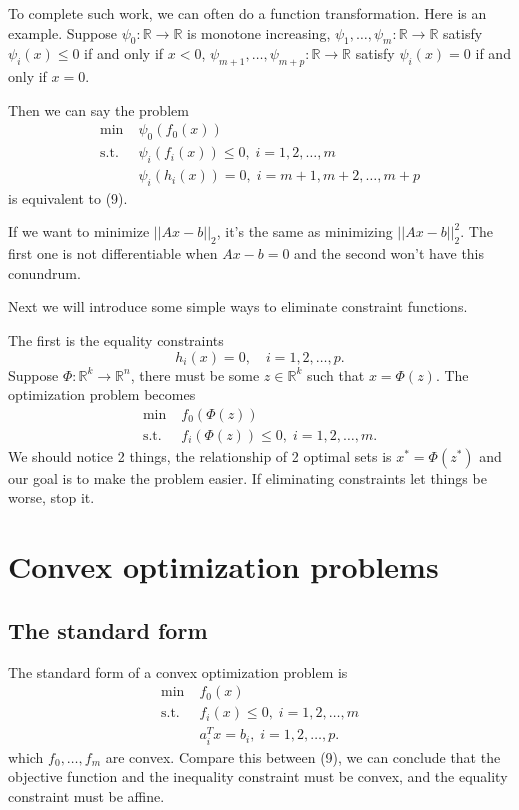 \documentclass[lang=en,color=blue,mode=fancy,titlestyle=hang]{elegantbook}
\begin{document}
To complete such work, we can often do a function transformation. Here is an example.
Suppose $\psi_0: \mathbb{R} \rightarrow \mathbb{R}$ is monotone increasing,
$\psi_1, \ldots, \psi_m: \mathbb{R} \rightarrow \mathbb{R}$ satisfy $\psi_i(x) \leq 0$
if and only if $x < 0$, $\psi_{m+1}, \ldots, \psi_{m+p}: \mathbb{R} \rightarrow \mathbb{R}$
satisfy $\psi_i(x) = 0$ if and only if $x = 0$.

Then we can say the problem
\begin{align*}
  \min \; &\psi_0(f_0(x)) \\
  \text{s.t.} \; &\psi_i(f_i(x)) \leq 0, \; i = 1, 2, \ldots, m \\
  &\psi_i(h_i(x)) = 0, \; i = m + 1, m + 2, \ldots, m + p
\end{align*}
is equivalent to (9).

If we want to minimize $||A x - b||_2$, it's the same as minimizing $||A x - b||_2^2$.
The first one is not differentiable when $Ax - b = 0$ and the second won't have this
conundrum.

Next we will introduce some simple ways to eliminate constraint functions.

The first is the equality constraints
\[
h_i(x) = 0, \quad i = 1, 2, \ldots, p.
\]
Suppose $\Phi: \mathbb{R}^k \rightarrow \mathbb{R}^n$, there must be some $z \in \mathbb{R}^k$
such that $x = \Phi(z)$. The optimization problem becomes
\begin{align*}
  \min \; &f_0(\Phi(z)) \\
  \text{s.t.} \; &f_i(\Phi(z)) \leq 0, \; i = 1, 2, \ldots, m.
\end{align*}
We should notice 2 things, the relationship of 2 optimal sets is $x^* = \Phi(z^*)$ and
our goal is to make the problem easier. If eliminating constraints let things be worse,
stop it.

\section{Convex optimization problems}
\subsection{The standard form}
The standard form of a convex optimization problem is
\begin{align*}
  \min \; &f_0(x) \\
  \text{s.t.} \; &f_i(x) \leq 0, \; i = 1, 2, \ldots, m \\
  &a_i^T x = b_i, \; i = 1, 2, \ldots, p.
\end{align*}
which $f_0, \ldots, f_m$ are convex. Compare this between (9), we can conclude that
the objective function and the inequality constraint must be convex, and the equality
constraint must be affine.
\end{document}
